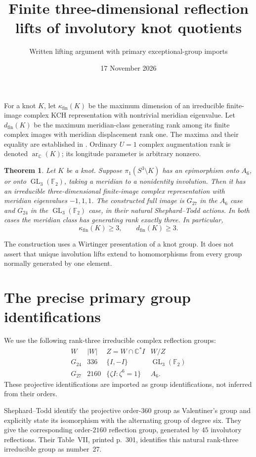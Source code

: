 \documentclass[11pt]{article}
\title{Finite three-dimensional reflection lifts of involutory knot quotients}
\author{Written lifting argument with primary exceptional-group imports}
\date{17 November 2026}
\newtheorem{theorem}{Theorem}
\newcommand{\C}{\mathbb C}
\newcommand{\F}{\mathbb F}
\newcommand{\GL}{\operatorname{GL}}
\newcommand{\ar}{\operatorname{ar}_{\C}}
\newcommand{\kfin}{\kappa_{\mathrm{fin}}}
\newcommand{\dfin}{d_{\mathrm{fin}}}
\begin{document}
\maketitle

For a knot $K$, let $\kfin(K)$ be the maximum dimension of an
irreducible finite-image complex KCH representation with nontrivial
meridian eigenvalue. Let $\dfin(K)$ be the maximum meridian-class
generating rank among its finite complex images with meridian
displacement rank one. The maxima and their equality are established
in \cite[Corollary~\texttt{cor:finitecapacity}]{domination}.
Ordinary $U=1$ complex augmentation rank is denoted $\ar(K)$; its
longitude parameter is arbitrary nonzero.

\begin{theorem}\label{thm:lifts}
Let $K$ be a knot. Suppose $\pi_1(S^3\setminus K)$ has an epimorphism
onto $A_6$, or onto $\GL_3(\F_2)$, taking a meridian to a nonidentity
involution. Then it has an irreducible three-dimensional finite-image
complex representation with meridian eigenvalues $-1,1,1$.
The constructed full image is $G_{27}$ in the $A_6$ case and $G_{24}$
in the $\GL_3(\F_2)$ case, in their natural Shephard--Todd actions.
In both cases the meridian class has generating rank exactly three.
In particular,
\[
                    \kfin(K)\ge3,\qquad \dfin(K)\ge3.
\]
\end{theorem}

The construction uses a Wirtinger presentation of a knot group.
It does not assert that unique involution lifts extend to
homomorphisms from every group normally generated by one element.

\section{The precise primary group identifications}

We use the following rank-three irreducible complex reflection groups:
\[
\begin{array}{c|r|c|c}
 W&|W|&Z=W\cap\C^*I& W/Z\\\hline
 G_{24}&336&\{I,-I\}&\GL_3(\F_2)\\
 G_{27}&2160&\{\zeta I:\zeta^6=1\}&A_6 .
\end{array}
\]
These projective identifications are imported as group
identifications, not inferred from their orders.

Shephard--Todd \cite[Section~3, printed p.~278]{st54} identify the
projective order-$360$ group as Valentiner's group and explicitly
state its isomorphism with the alternating group of degree six.
They give the corresponding order-$2160$ reflection group, generated
by $45$ involutory reflections. Their Table~VII, printed p.~301,
identifies this natural rank-three irreducible group as number~27.
\end{document}
